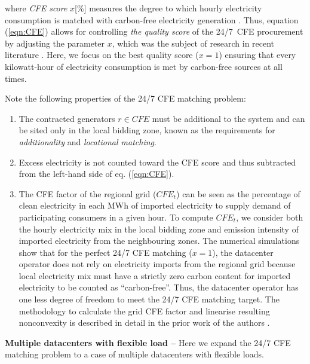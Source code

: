 \noindent where \textit{CFE score} $x$[\%] measures the degree to which hourly electricity consumption is matched with carbon-free electricity generation \cite{google-methodologies}. Thus, equation (\ref{eqn:CFE}) allows for controlling \textit{the quality score} of the 24/7~CFE procurement by adjusting the parameter $x$, which was the subject of research in recent literature \cite{riepinMeansCostsSystemlevel2023,xu-247CFE-report}. Here, we focus on the best quality score ($x=1$) ensuring that every kilowatt-hour of electricity consumption is met by carbon-free sources at all times.

Note the following properties of the 24/7 CFE matching problem:

\begin{enumerate}
    \item The contracted generators $r\in CFE$ must be additional to the system and can be sited only in the local bidding zone, known as the requirements for \textit{additionality} and \textit{locational matching}.
    \item Excess electricity is not counted toward the CFE score and thus subtracted from the left-hand side of eq. (\ref{eqn:CFE}).
    \item The CFE factor of the regional grid ($CFE_t$) can be seen as the percentage of clean electricity in each MWh of imported electricity to supply demand of participating consumers in a given hour.
    To compute $CFE_t$, we consider both the hourly electricity mix in the local bidding zone and emission intensity of imported electricity from the neighbouring zones.
    The numerical simulations show that for the perfect 24/7 CFE matching ($x=1$), the datacenter operator does not rely on electricity imports from the regional grid because local electricity mix must have a strictly zero carbon content for imported electricity to be counted as \enquote{carbon-free}.
    Thus, the datacenter operator has one less degree of freedom to meet the 24/7 CFE matching target.
    The methodology to calculate the grid CFE factor and linearise resulting nonconvexity is described in detail in the prior work of the authors \cite{riepin-zenodo-systemlevel247}.
\end{enumerate}

\textbf{Multiple datacenters with flexible load --} Here we expand the 24/7 CFE matching problem to a case of multiple datacenters with flexible loads.

